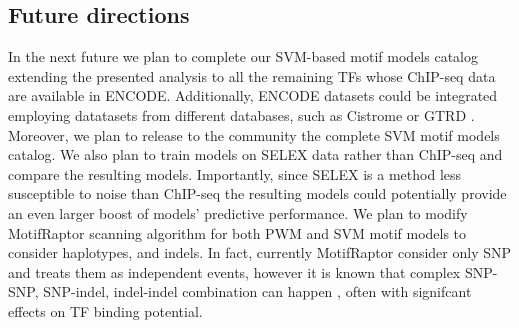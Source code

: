 \documentclass[a4paper, titlepage, openright]{book}
\newcommand{\motifraptor}{MotifRaptor\xspace}
\begin{document}
\subsection{Future directions}
In the next future we plan to complete our SVM-based motif models catalog extending the presented analysis to all the remaining TFs whose ChIP-seq data are available in ENCODE. Additionally, ENCODE datasets could be integrated employing datatasets from different databases, such as Cistrome \citep{zheng2019cistrome} or GTRD \citep{kolmykov2021gtrd}. Moreover, we plan to release to the community the complete SVM motif models catalog. We also plan to train models on SELEX data rather than ChIP-seq and compare the resulting models. Importantly, since SELEX is a method less susceptible to noise than ChIP-seq the resulting models could potentially provide an even larger boost of models' predictive performance. We plan to modify \motifraptor scanning algorithm for both PWM and SVM motif models to consider haplotypes, and indels. In fact,  currently \motifraptor consider only SNP and treats them as independent events, however it is known that complex SNP-SNP, SNP-indel, indel-indel combination can happen \citep{tognon2021grafimo}, often with signifcant effects on TF binding potential.
\end{document}

